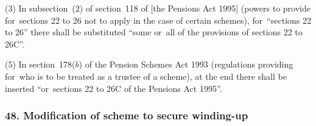 \documentclass[12pt,a4paper]{article}
\begin{document}
%
%
%
%

(3) In subsection~(2)  of section~118 of [the Pensions Act 1995]
(powers to provide for~sections 22 to 26 not to apply in the case of certain schemes), for~“sections 22 to 26” there shall be substituted “some or~all of the provisions of sections 22 to 26C”.


(5) In section~178($b$)  of the Pension Schemes Act 1993 (regulations providing for~who is to be treated as a trustee of a scheme), at the end there shall be inserted “or~sections 22 to 26C of the Pensions Act 1995”.


\subsubsection{48. Modification of scheme to secure winding-up}
\end{document}
